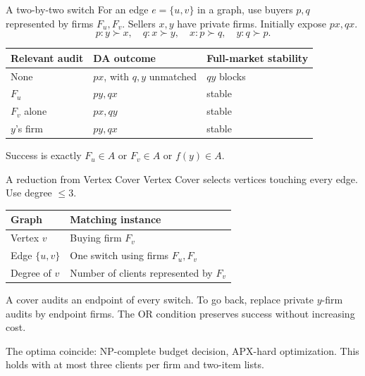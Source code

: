 \begin{frame}[t,label=switch]{A two-by-two switch}
\small
For an edge $e=\{u,v\}$ in a graph, use buyers $p,q$ represented by firms
$F_u,F_v$. Sellers $x,y$ have private firms. Initially expose $px,qx$.
\[
 p:y\succ x,\quad q:x\succ y,\quad
 x:p\succ q,\quad y:q\succ p.
\]
\begin{center}
\begin{tabular}{@{}lll@{}}
\toprule
Relevant audit & DA outcome & Full-market stability\\
\midrule
None & $px$, with $q,y$ unmatched & $qy$ blocks\\
$F_u$ & $py,qx$ & stable\\
$F_v$ alone & $px,qy$ & stable\\
$y$'s firm & $py,qx$ & stable\\
\bottomrule
\end{tabular}
\end{center}
Success is exactly $F_u\in A$ or $F_v\in A$ or $f(y)\in A$.
\end{frame}

\begin{frame}[t,label=hardness]{A reduction from Vertex Cover}
\small
\setlength{\parskip}{2pt}
Vertex Cover selects vertices touching every edge. Use degree $\leq3$.
\par\smallskip
{\centering
\begin{tabular}{@{}ll@{}}
\toprule
Graph & Matching instance\\
\midrule
Vertex $v$ & Buying firm $F_v$\\
Edge $\{u,v\}$ & One switch using firms $F_u,F_v$\\
Degree of $v$ & Number of clients represented by $F_v$\\
\bottomrule
\end{tabular}
\par}
\smallskip
A cover audits an endpoint of every switch. To go back, replace private
$y$-firm audits by endpoint firms. The OR condition preserves success
without increasing cost.

The optima coincide: NP-complete budget decision, APX-hard optimization.
This holds with at most three clients per firm and two-item lists.
\end{frame}


